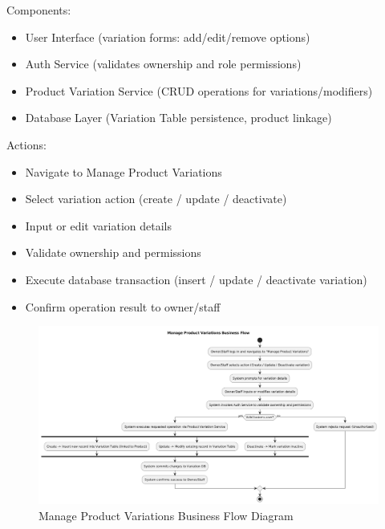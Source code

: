 \documentclass[]{VUMIFTemplateClass}
\begin{document}
Components:
\begin{itemize}
\setlength{\itemsep}{2pt}
\setlength{\parskip}{0pt}
\setlength{\parsep}{0pt}
\item User Interface (variation forms: add/edit/remove options)
\item Auth Service (validates ownership and role permissions)
\item Product Variation Service (CRUD operations for variations/modifiers)
\item Database Layer (Variation Table persistence, product linkage)
\end{itemize}

Actions:
\begin{itemize}
\setlength{\itemsep}{2pt}
\setlength{\parskip}{0pt}
\setlength{\parsep}{0pt}
\item Navigate to Manage Product Variations
\item Select variation action (create / update / deactivate)
\item Input or edit variation details
\item Validate ownership and permissions
\item Execute database transaction (insert / update / deactivate variation)
\item Confirm operation result to owner/staff
\end{itemize}

\begin{figure}[H]
    \centering
    \includegraphics[width=1\textwidth]{images/diagrams/business/bpmn_product_variations.png}
    \caption{Manage Product Variations Business Flow Diagram}
    \label{fig:product_variations_manage_flow}
\end{figure}
\end{document}
